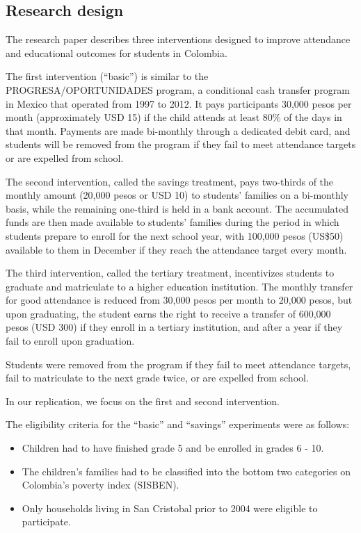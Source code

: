 \documentclass[
]{article}
\providecommand{\tightlist}{%
  \setlength{\itemsep}{0pt}\setlength{\parskip}{0pt}}
\begin{document}
\hypertarget{research-design}{%
\subsection{Research design}\label{research-design}}

The research paper describes three interventions designed to improve
attendance and educational outcomes for students in Colombia.

The first intervention (``basic'') is similar to the
PROGRESA/OPORTUNIDADES program, a conditional cash transfer program in
Mexico that operated from 1997 to 2012. It pays participants 30,000
pesos per month (approximately USD 15) if the child attends at least
80\% of the days in that month. Payments are made bi-monthly through a
dedicated debit card, and students will be removed from the program if
they fail to meet attendance targets or are expelled from school.

The second intervention, called the savings treatment, pays two-thirds
of the monthly amount (20,000 pesos or USD 10) to students' families on
a bi-monthly basis, while the remaining one-third is held in a bank
account. The accumulated funds are then made available to students'
families during the period in which students prepare to enroll for the
next school year, with 100,000 pesos (US\$50) available to them in
December if they reach the attendance target every month.

The third intervention, called the tertiary treatment, incentivizes
students to graduate and matriculate to a higher education institution.
The monthly transfer for good attendance is reduced from 30,000 pesos
per month to 20,000 pesos, but upon graduating, the student earns the
right to receive a transfer of 600,000 pesos (USD 300) if they enroll in
a tertiary institution, and after a year if they fail to enroll upon
graduation.

Students were removed from the program if they fail to meet attendance
targets, fail to matriculate to the next grade twice, or are expelled
from school.

In our replication, we focus on the first and second intervention.

The eligibility criteria for the ``basic'' and ``savings'' experiments
were as follows:

\begin{itemize}
\tightlist
\item
  Children had to have finished grade 5 and be enrolled in grades 6 -
  10.
\item
  The children's families had to be classified into the bottom two
  categories on Colombia's poverty index (SISBEN).
\item
  Only households living in San Cristobal prior to 2004 were eligible to
  participate.
\end{itemize}
\end{document}
